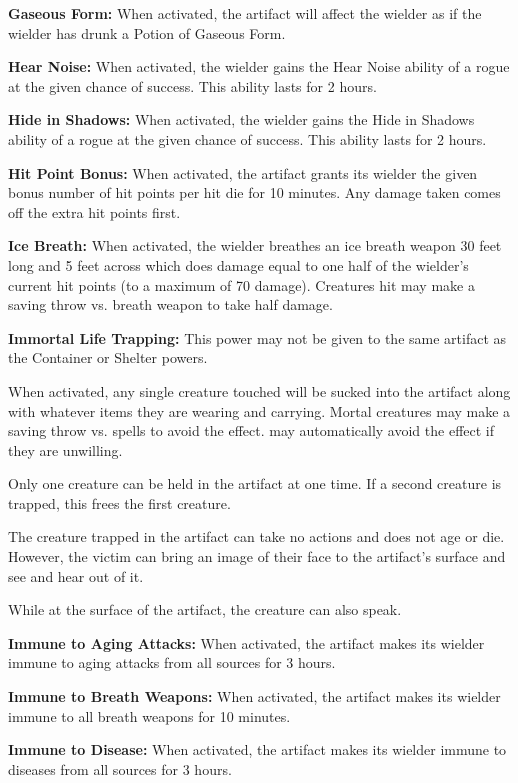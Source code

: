 \begin{multicols*}{2}
\textbf{Gaseous Form:} When activated, the artifact will affect the wielder as if the wielder has drunk a Potion of Gaseous Form.

\textbf{Hear Noise:} When activated, the wielder gains the Hear Noise ability of a rogue at the given chance of success. This ability lasts for 2 hours.

\textbf{Hide in Shadows:} When activated, the wielder gains the Hide in Shadows ability of a rogue at the given chance of success. This ability lasts for 2 hours.

\textbf{Hit Point Bonus:} When activated, the artifact grants its wielder the given bonus number of hit points per hit die for 10 minutes. Any damage taken comes off the extra hit points first.

\textbf{Ice Breath:} When activated, the wielder breathes an ice breath weapon 30 feet long and 5 feet across which does damage equal to one half of the wielder’s current hit points (to a maximum of 70 damage). Creatures hit may make a saving throw vs. breath weapon to take half damage.

\textbf{Immortal Life Trapping:} This power may not be given to the same artifact as the Container or Shelter powers.

When activated, any single creature touched will be sucked into the artifact along with whatever items they are wearing and carrying. Mortal creatures may make a saving throw vs. spells to avoid the effect.  may automatically avoid the effect if they are unwilling.

Only one creature can be held in the artifact at one time. If a second creature is trapped, this frees the first creature.

The creature trapped in the artifact can take no actions and does not age or die. However, the victim can bring an image of their face to the artifact’s surface and see and hear out of it.

While at the surface of the artifact, the creature can also speak.

\textbf{Immune to Aging Attacks:} When activated, the artifact makes its wielder immune to aging attacks from all sources for 3 hours.

\textbf{Immune to Breath Weapons:} When activated, the artifact makes its wielder immune to all breath weapons for 10 minutes.

\textbf{Immune to Disease:} When activated, the artifact makes its wielder immune to diseases from all sources for 3 hours.


\end{multicols*}
